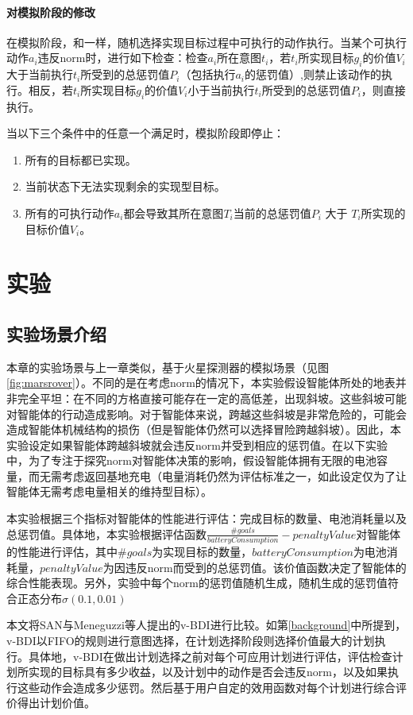 \paragraph{对模拟阶段的修改}
在模拟阶段，\SAN 和\SA 一样，随机选择实现目标过程中可执行的动作执行。当某个可执行动作$a_i$违反norm时，进行如下检查：检查$a_i$所在意图$t_i$，若$t_i$所实现目标$g_i$的价值$V_i$大于当前执行$t_i$所受到的总惩罚值$P_i$（包括执行$a_i$的惩罚值）,则禁止该动作的执行。相反，若$t_i$所实现目标$g_i$的价值$V_i$小于当前执行$t_i$所受到的总惩罚值$P_i$，则直接执行。

当以下三个条件中的任意一个满足时，模拟阶段即停止：
\begin{enumerate}
  \item 所有的目标都已实现。
  \item 当前状态下无法实现剩余的实现型目标。
  \item 所有的可执行动作$a_i$都会导致其所在意图$T_i$当前的总惩罚值$P_i$ 大于 $T_i$所实现的目标价值$V_i$。
\end{enumerate}

\section{实验}
\subsection{实验场景介绍}
本章的实验场景与上一章类似，基于火星探测器的模拟场景（见图\ref{fig:marsrover}）。不同的是在考虑norm的情况下，本实验假设智能体所处的地表并非完全平坦：在不同的方格直接可能存在一定的高低差，出现斜坡。这些斜坡可能对智能体的行动造成影响。对于智能体来说，跨越这些斜坡是非常危险的，可能会造成智能体机械结构的损伤（但是智能体仍然可以选择冒险跨越斜坡）。因此，本实验设定如果智能体跨越斜坡就会违反norm并受到相应的惩罚值。在以下实验中，为了专注于探究norm对智能体决策的影响，假设智能体拥有无限的电池容量，而无需考虑返回基地充电（电量消耗仍然为评估标准之一，如此设定仅为了让智能体无需考虑电量相关的维持型目标）。

本实验根据三个指标对智能体的性能进行评估：完成目标的数量、电池消耗量以及总惩罚值。具体地，本实验根据评估函数$\frac{\#goals}{batteryConsumption} - penaltyValue$对智能体的性能进行评估，其中$\#goals$为实现目标的数量，$batteryConsumption$为电池消耗量，$penaltyValue$为因违反norm而受到的总惩罚值。该价值函数决定了智能体的综合性能表现。另外，实验中每个norm的惩罚值随机生成，随机生成的惩罚值符合正态分布$\sigma(0.1, 0.01)$

本文将SAN与Meneguzzi等人提出的v-BDI\cite{}进行比较。如第\ref{background}中所提到，v-BDI以FIFO的规则进行意图选择，在计划选择阶段则选择价值最大的计划执行。具体地，v-BDI在做出计划选择之前对每个可应用计划进行评估，评估检查计划所实现的目标具有多少收益，以及计划中的动作是否会违反norm，以及如果执行这些动作会造成多少惩罚。然后基于用户自定的效用函数对每个计划进行综合评价得出计划价值。


